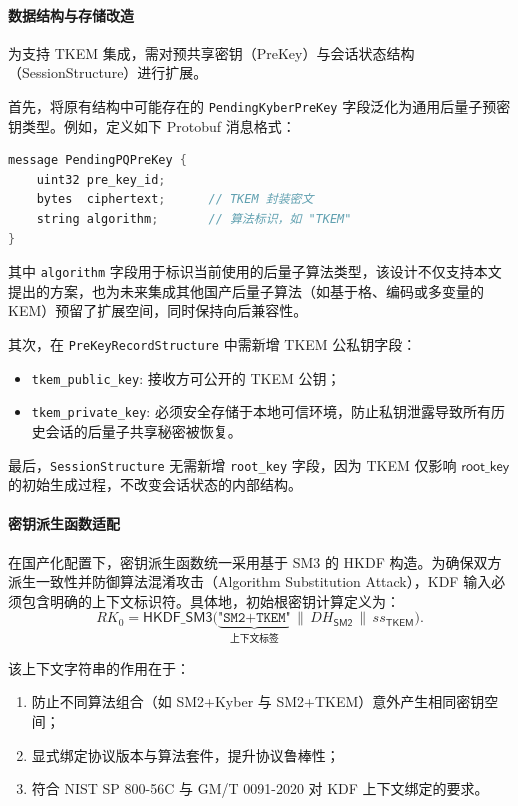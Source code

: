 \paragraph{数据结构与存储改造}{}
\label{subsec:data_structure}

为支持 TKEM 集成，需对预共享密钥（PreKey）与会话状态结构（SessionStructure）进行扩展。

首先，将原有结构中可能存在的 \texttt{PendingKyberPreKey} 字段泛化为通用后量子预密钥类型。例如，定义如下 Protobuf 消息格式：
\begin{lstlisting}[language=Rust, caption={通用后量子预密钥结构}, label=lst:pq_prekey]
message PendingPQPreKey {
    uint32 pre_key_id;
    bytes  ciphertext;      // TKEM 封装密文
    string algorithm;       // 算法标识，如 "TKEM"
}
\end{lstlisting}
其中 \texttt{algorithm} 字段用于标识当前使用的后量子算法类型，该设计不仅支持本文提出的方案，也为未来集成其他国产后量子算法（如基于格、编码或多变量的 KEM）预留了扩展空间，同时保持向后兼容性。

其次，在 \texttt{PreKeyRecordStructure} 中需新增 TKEM 公私钥字段：
\begin{itemize}
    \item \texttt{tkem\_public\_key}: 接收方可公开的 TKEM 公钥；
    \item \texttt{tkem\_private\_key}: 必须安全存储于本地可信环境，防止私钥泄露导致所有历史会话的后量子共享秘密被恢复。
\end{itemize}

最后，\texttt{SessionStructure} 无需新增 \texttt{root\_key} 字段，因为 TKEM 仅影响 $\mathsf{root\_key}$ 的初始生成过程，不改变会话状态的内部结构。

\paragraph{密钥派生函数适配}
\label{subsec:kdf_adaptation}

在国产化配置下，密钥派生函数统一采用基于 SM3 的 HKDF 构造。为确保双方派生一致性并防御算法混淆攻击（Algorithm Substitution Attack），KDF 输入必须包含明确的上下文标识符。具体地，初始根密钥计算定义为：
\[
RK_0 = \mathsf{HKDF\_SM3}\Big( \underbrace{\texttt{"SM2+TKEM"}}_{\text{上下文标签}} \,\|\, DH_{\mathsf{SM2}} \,\|\, ss_{\mathsf{TKEM}} \Big).
\]

该上下文字符串的作用在于：
\begin{enumerate}
    \item 防止不同算法组合（如 SM2+Kyber 与 SM2+TKEM）意外产生相同密钥空间；
    \item 显式绑定协议版本与算法套件，提升协议鲁棒性；
    \item 符合 NIST SP 800-56C 与 GM/T 0091-2020 对 KDF 上下文绑定的要求。
\end{enumerate}

